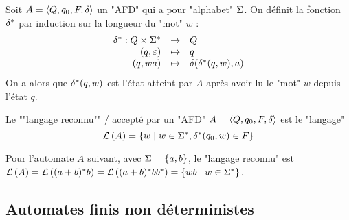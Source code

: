 \begin{definition}
	Soit $A = \langle Q, q_0, F, \delta \rangle$ un "AFD" qui a pour "alphabet" $\Sigma$. On définit la fonction $\delta^{*}$ par induction sur la longueur du "mot" $w$ :
	$$ \begin{array}{rcl}
			\delta^{*} : Q \times \Sigma^{*} & \to     & Q                               \\
			(q, \varepsilon)                   & \mapsto & q                               \\
			(q, wa)                         & \mapsto & \delta(\delta^{*}(q, w), a)
		\end{array} $$
	On a alors que $\delta^{*}(q, w)$ est l'état atteint par $A$ après avoir lu le "mot" $w$ depuis l'état $q$.
\end{definition}

\begin{definition}
	Le ""langage reconnu"" / accepté par un "AFD" $A = \langle Q, q_0, F, \delta \rangle$ est le "langage"
	$$ \mathcal{L}\left(A\right) = \left\{w \mid w \in \Sigma^{*}, \delta^{*}(q_0, w) \in F\right\} $$
\end{definition}

\begin{exemple}
	Pour l'automate $A$ suivant, avec $\Sigma = \left\{a,b\right\}$, le "langage reconnu" est 
    $\mathcal{L}\left(A\right) = \mathcal{L}\left((a + b)^{*} b\right) = \mathcal{L}\left((a + b)^{*} b b^{*}\right) = \left\{wb \mid w \in \Sigma^{*}\right\}$.

	\begin{center}
		\begin{automata}
		\end{automata}
	\end{center}
\end{exemple}

\subsection{Automates finis non déterministes }

